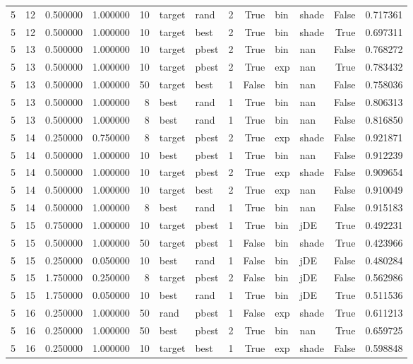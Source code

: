 \begin{tabular}{rrrrrllrrllrr}
5 & 12 & 0.500000 & 1.000000 & 10 & target & rand & 2 & True & bin & shade & False & 0.717361 \\
5 & 12 & 0.500000 & 1.000000 & 10 & target & best & 2 & True & bin & shade & True & 0.697311 \\
5 & 13 & 0.500000 & 1.000000 & 10 & target & pbest & 2 & True & bin & nan & False & 0.768272 \\
5 & 13 & 0.500000 & 1.000000 & 10 & target & pbest & 2 & True & exp & nan & True & 0.783432 \\
5 & 13 & 0.500000 & 1.000000 & 50 & target & best & 1 & False & bin & nan & False & 0.758036 \\
5 & 13 & 0.500000 & 1.000000 & 8 & best & rand & 1 & True & bin & nan & False & 0.806313 \\
5 & 13 & 0.500000 & 1.000000 & 8 & best & rand & 1 & True & bin & nan & False & 0.816850 \\
5 & 14 & 0.250000 & 0.750000 & 8 & target & pbest & 2 & True & exp & shade & False & 0.921871 \\
5 & 14 & 0.500000 & 1.000000 & 10 & best & pbest & 1 & True & bin & nan & False & 0.912239 \\
5 & 14 & 0.500000 & 1.000000 & 10 & target & pbest & 2 & True & exp & shade & False & 0.909654 \\
5 & 14 & 0.500000 & 1.000000 & 10 & target & best & 2 & True & exp & nan & False & 0.910049 \\
5 & 14 & 0.500000 & 1.000000 & 8 & best & rand & 1 & True & bin & nan & False & 0.915183 \\
5 & 15 & 0.750000 & 1.000000 & 10 & target & pbest & 1 & True & bin & jDE & True & 0.492231 \\
5 & 15 & 0.500000 & 1.000000 & 50 & target & pbest & 1 & False & bin & shade & True & 0.423966 \\
5 & 15 & 0.250000 & 0.050000 & 10 & best & rand & 1 & False & bin & jDE & False & 0.480284 \\
5 & 15 & 1.750000 & 0.250000 & 8 & target & pbest & 2 & False & bin & jDE & False & 0.562986 \\
5 & 15 & 1.750000 & 0.050000 & 10 & best & rand & 1 & True & bin & jDE & True & 0.511536 \\
5 & 16 & 0.250000 & 1.000000 & 50 & rand & pbest & 1 & False & exp & shade & True & 0.611213 \\
5 & 16 & 0.250000 & 1.000000 & 50 & best & pbest & 2 & True & bin & nan & True & 0.659725 \\
5 & 16 & 0.250000 & 1.000000 & 10 & target & best & 1 & True & exp & shade & False & 0.598848 \\

\end{tabular}
